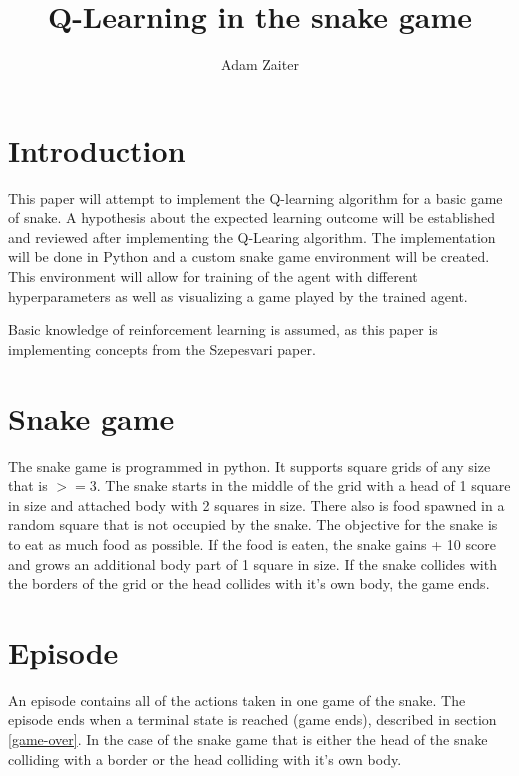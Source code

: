 \documentclass[lettersize,journal]{IEEEtran}
\begin{document}
\title{Q-Learning in the snake game}
\author{Adam Zaiter}

\maketitle

\begin{abstract}
\end{abstract}

\begin{IEEEkeywords}
\end{IEEEkeywords}


\section{Introduction}
This paper will attempt to implement the Q-learning algorithm
for a basic game of snake. A hypothesis about the expected learning
outcome will be established and reviewed after implementing the
Q-Learing algorithm. The implementation will be done in Python
and a custom snake game environment will be created.
This environment will allow for training of the agent with different
hyperparameters as well as visualizing a game played by the
trained agent.


Basic knowledge of reinforcement learning is assumed, as this paper
is implementing concepts from the Szepesvari paper.

\section{Snake game}
The snake game is programmed in python.
It supports square grids of any size that is $>= 3$.
The snake starts in the middle of the grid with a head of
1 square in size and attached
body with 2 squares in size. There also is food spawned in a random
square that is not occupied by the snake. The objective for the
snake is to eat as much food as possible. If the food is eaten,
the snake gains + 10 score and grows an additional body part of
1 square in size. If the snake collides with the borders of the grid
or the head collides with it's own body, the game ends.\label{game-over}

\section{Episode}
An episode contains all of the actions taken in one game
of the snake. The episode ends when a terminal state is
reached (game ends), described in section \ref{game-over}. In the case of the snake game that is either
the head of the snake colliding with a border or the head
colliding with it's own body.
\end{document}
